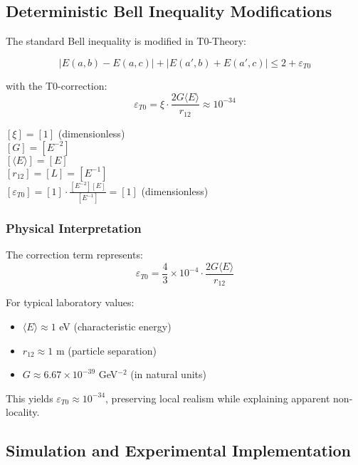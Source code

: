 \documentclass[12pt,a4paper]{article}
\theoremstyle{definition}
\begin{document}
\subsection{Deterministic Bell Inequality Modifications}

The standard Bell inequality is modified in T0-Theory:

\begin{equation}
	\boxed{|E(a,b) - E(a,c)| + |E(a',b) + E(a',c)| \leq 2 + \varepsilon_{T0}}
\end{equation}

with the T0-correction:
\begin{equation}
	\varepsilon_{T0} = \xi \cdot \frac{2G\langle E \rangle}{r_{12}} \approx 10^{-34}
\end{equation}

\begin{einheitencheck}
	$[\xi] = [1]$ (dimensionless) \checkmark\\
	$[G] = [E^{-2}]$ \checkmark\\
	$[\langle E \rangle] = [E]$ \checkmark\\
	$[r_{12}] = [L] = [E^{-1}]$ \checkmark\\
	$[\varepsilon_{T0}] = [1] \cdot \frac{[E^{-2}][E]}{[E^{-1}]} = [1]$ (dimensionless) \checkmark
\end{einheitencheck}

\subsubsection{Physical Interpretation}

The correction term represents:
\begin{equation}
	\varepsilon_{T0} = \frac{4}{3} \times 10^{-4} \cdot \frac{2G\langle E \rangle}{r_{12}}
\end{equation}

For typical laboratory values:
\begin{itemize}
	\item $\langle E \rangle \approx 1$ eV (characteristic energy)
	\item $r_{12} \approx 1$ m (particle separation)
	\item $G \approx 6.67 \times 10^{-39}$ GeV$^{-2}$ (in natural units)
\end{itemize}

This yields $\varepsilon_{T0} \approx 10^{-34}$, preserving local realism while explaining apparent non-locality.

\subsection{Simulation and Experimental Implementation}
\end{document}
